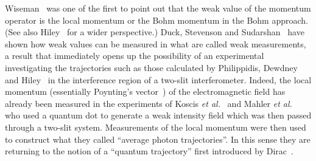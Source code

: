 \documentclass[12pt]{article}%
\begin{document}
Wiseman~\cite{hw03} was one of the first to point out that the weak value of
the
momentum operator is the local momentum or the Bohm momentum in the Bohm
approach. (See also Hiley~\cite{bh12} for a wider perspective.)
Duck, Stevenson and Sudarshan~\cite{idpsgs89} have shown how weak values can
be measured in what are called weak measurements, a result
that immediately opens up the possibility of an experimental investigating the
trajectories such as those calculated by Philippidis, Dewdney and
Hiley~\cite{cpcdbh79} in the interference region of a two-slit
interferometer.
Indeed, the local momentum (essentially Poynting's vector~\cite{kbab13}) of
the electromagnetic field has already been measured in the experiments of
Koscis \emph{et al.}~\cite{skbb11} and Mahler \emph{et al.}~\cite{dmas15} who
used a quantum dot to generate a weak intensity field which was then passed
through a two-slit system. Measurements of the local momentum were then used
to construct what they called \textquotedblleft average photon trajectories''.
In this sense they are returning to the notion of a ``quantum trajectory''
first introduced by Dirac~\cite{pd45}.
\end{document}

